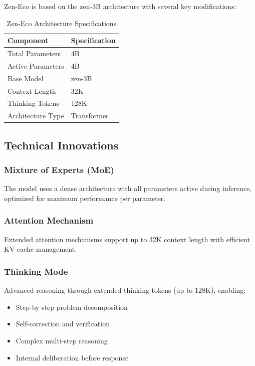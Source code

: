 \documentclass[11pt,a4paper]{article}
\begin{document}
Zen-Eco is based on the zen-3B architecture with several key modifications:

\begin{table}[H]
\centering
\begin{tabular}{ll}
\toprule
\textbf{Component} & \textbf{Specification} \\
\midrule
Total Parameters & 4B \\
Active Parameters & 4B \\
Base Model & zen-3B \\
Context Length & 32K \\
Thinking Tokens & 128K \\

Architecture Type & Transformer \\
\bottomrule
\end{tabular}
\caption{Zen-Eco Architecture Specifications}
\end{table}

\subsection{Technical Innovations}

\subsubsection{Mixture of Experts (MoE)}
The model uses a dense architecture with all parameters active during inference, optimized for maximum performance per parameter.

\subsubsection{Attention Mechanism}
Extended attention mechanisms support up to 32K context length with efficient KV-cache management.

\subsubsection{Thinking Mode}
Advanced reasoning through extended thinking tokens (up to 128K), enabling:
\begin{itemize}
    \item Step-by-step problem decomposition
    \item Self-correction and verification
    \item Complex multi-step reasoning
    \item Internal deliberation before response
\end{itemize}
\end{document}
